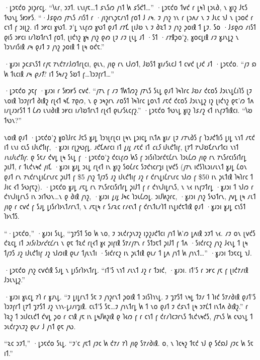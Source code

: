 ·𐑛𐑮𐑱𐑒𐑴 𐑜𐑦𐑜𐑩𐑤𐑛. “𐑘𐑧𐑩, 𐑮𐑲𐑑. 𐑧𐑯𐑦𐑢𐑱…𐑑 𐑭𐑯𐑕𐑼 𐑢𐑪𐑑 𐑿 𐑭𐑕𐑒𐑑…” ·𐑛𐑮𐑱𐑒𐑴 𐑑𐑫𐑒 𐑩 𐑛𐑰𐑐 𐑚𐑮𐑧𐑔, 𐑯 𐑣𐑦𐑟 𐑓𐑱𐑕 𐑑𐑻𐑯𐑛 𐑕𐑽𐑾𐑕. “·𐑓𐑭𐑞𐑼 𐑢𐑳𐑯𐑕 𐑥𐑦𐑕𐑑 𐑩 ·𐑢𐑦𐑟𐑩𐑯𐑜𐑱𐑥𐑪𐑑 𐑝𐑴𐑑 𐑓 𐑥𐑰. 𐑲 𐑢𐑪𐑟 𐑪𐑯 𐑩 𐑚𐑮𐑵𐑥 𐑯 𐑲 𐑓𐑧𐑤 𐑪𐑓 𐑯 𐑚𐑮𐑴𐑒 𐑩 𐑤𐑪𐑑 𐑝 𐑮𐑦𐑚𐑟. 𐑦𐑑 𐑮𐑾𐑤𐑦 𐑣𐑻𐑑. 𐑲'𐑛 𐑯𐑧𐑝𐑼 𐑣𐑻𐑑 𐑞𐑨𐑑 𐑥𐑳𐑗 𐑚𐑦𐑓𐑹 𐑯 𐑲 𐑔𐑷𐑑 𐑲 𐑢𐑪𐑟 𐑜𐑴𐑦𐑙 𐑑 𐑛𐑲. 𐑕𐑴 ·𐑓𐑭𐑞𐑼 𐑥𐑦𐑕𐑑 𐑞𐑦𐑕 𐑮𐑾𐑤𐑦 𐑦𐑥𐑐𐑹𐑑𐑩𐑯𐑑 𐑝𐑴𐑑, 𐑚𐑦𐑒𐑪𐑟 𐑣𐑰 𐑢𐑪𐑟 𐑞𐑺 𐑚𐑲 𐑥𐑲 𐑚𐑧𐑛 𐑨𐑑 ·𐑕𐑑 ·𐑥𐑳𐑙𐑜𐑴'𐑟, 𐑣𐑴𐑤𐑛𐑦𐑙 𐑥𐑲 𐑣𐑨𐑯𐑛𐑟 𐑯 𐑐𐑮𐑪𐑥𐑦𐑕𐑦𐑙 𐑥𐑰 𐑞𐑨𐑑 𐑲 𐑢𐑪𐑟 𐑜𐑴𐑦𐑙 𐑑 𐑚𐑰 𐑴𐑒𐑱.”

·𐑣𐑨𐑮𐑦 𐑜𐑤𐑭𐑯𐑕𐑑 𐑩𐑢𐑱 𐑳𐑯𐑒𐑳𐑥𐑓𐑼𐑑𐑩𐑚𐑤𐑦, 𐑞𐑧𐑯, 𐑢𐑦𐑞 𐑩𐑯 𐑧𐑓𐑼𐑑, 𐑓𐑹𐑕𐑑 𐑣𐑦𐑥𐑕𐑧𐑤𐑓 𐑑 𐑤𐑫𐑒 𐑚𐑨𐑒 𐑨𐑑 ·𐑛𐑮𐑱𐑒𐑴. “𐑢𐑲 𐑸 𐑿 𐑑𐑧𐑤𐑦𐑙 𐑥𐑰 \emph{𐑞𐑨𐑑}? 𐑦𐑑 𐑕𐑰𐑥𐑟 𐑕𐑹𐑑 𐑝…𐑐𐑮𐑲𐑝𐑩𐑑…”

·𐑛𐑮𐑱𐑒𐑴 𐑜𐑱𐑝 ·𐑣𐑨𐑮𐑦 𐑩 𐑕𐑽𐑾𐑕 𐑤𐑫𐑒. “𐑢𐑳𐑯 𐑝 𐑥𐑲 𐑑𐑿𐑑𐑼𐑟 𐑢𐑳𐑯𐑕 𐑕𐑧𐑛 𐑞𐑨𐑑 𐑐𐑰𐑐𐑩𐑤 𐑓𐑹𐑥 𐑒𐑤𐑴𐑕 𐑓𐑮𐑧𐑯𐑛𐑖𐑦𐑐𐑕 𐑚𐑲 𐑯𐑴𐑦𐑙 𐑐𐑮𐑲𐑝𐑩𐑑 𐑔𐑦𐑙𐑟 𐑩𐑚𐑬𐑑 𐑰𐑗 𐑳𐑞𐑼, 𐑯 𐑞 𐑮𐑰𐑟𐑩𐑯 𐑥𐑴𐑕𐑑 𐑐𐑰𐑐𐑩𐑤 𐑛𐑴𐑯𐑑 𐑥𐑱𐑒 𐑒𐑤𐑴𐑕 𐑓𐑮𐑧𐑯𐑛𐑟 𐑦𐑟 𐑚𐑦𐑒𐑪𐑟 𐑞𐑱'𐑼 𐑑𐑵 𐑦𐑥𐑚𐑨𐑮𐑩𐑕𐑑 𐑑 𐑖𐑺 𐑧𐑯𐑦𐑔𐑦𐑙 𐑮𐑾𐑤𐑦 𐑦𐑥𐑐𐑹𐑑𐑩𐑯𐑑 𐑩𐑚𐑬𐑑 𐑞𐑧𐑥𐑕𐑧𐑤𐑝𐑟.” ·𐑛𐑮𐑱𐑒𐑴 𐑑𐑻𐑯𐑛 𐑣𐑦𐑟 𐑐𐑭𐑥𐑟 𐑬𐑑 𐑦𐑯𐑝𐑲𐑑𐑦𐑙𐑤𐑦. “𐑘𐑹 𐑑𐑻𐑯?”

𐑯𐑴𐑦𐑙 𐑞𐑨𐑑 ·𐑛𐑮𐑱𐑒𐑴'𐑟 𐑣𐑴𐑐𐑓𐑩𐑤 𐑓𐑱𐑕 𐑣𐑨𐑛 𐑐𐑮𐑪𐑚𐑩𐑚𐑤𐑦 𐑚𐑰𐑯 𐑛𐑮𐑦𐑤𐑛 𐑦𐑯𐑑𐑵 𐑣𐑦𐑥 𐑚𐑲 𐑥𐑳𐑯𐑔𐑕 𐑝 𐑐𐑮𐑨𐑒𐑑𐑦𐑕 𐑛𐑦𐑛 𐑯𐑪𐑑 𐑥𐑱𐑒 𐑦𐑑 𐑧𐑯𐑦 𐑤𐑧𐑕 𐑦𐑓𐑧𐑒𐑑𐑦𐑝, ·𐑣𐑨𐑮𐑦 𐑩𐑚𐑟𐑻𐑝𐑛. 𐑨𐑒𐑗𐑵𐑩𐑤𐑦 𐑦𐑑 \emph{𐑛𐑦𐑛} 𐑥𐑱𐑒 𐑦𐑑 \emph{𐑤𐑧𐑕} 𐑦𐑓𐑧𐑒𐑑𐑦𐑝, 𐑚𐑳𐑑 𐑳𐑯𐑓𐑹𐑗𐑩𐑯𐑩𐑑𐑤𐑦 𐑯𐑪𐑑 \emph{𐑦𐑯𐑦𐑓𐑧𐑒𐑑𐑦𐑝}. 𐑞 𐑕𐑱𐑥 𐑒𐑫𐑛 𐑚𐑰 𐑕𐑧𐑛 𐑝 ·𐑛𐑮𐑱𐑒𐑴'𐑟 𐑒𐑤𐑧𐑝𐑼 𐑿𐑕 𐑝 𐑮𐑦𐑕𐑦𐑐𐑮𐑩𐑒𐑱𐑖𐑩𐑯 𐑐𐑮𐑧𐑖𐑼 𐑢𐑦𐑞 𐑩𐑯 𐑳𐑯𐑕𐑩𐑤𐑦𐑕𐑦𐑑𐑩𐑛 𐑜𐑦𐑓𐑑, 𐑩 𐑑𐑧𐑒𐑯𐑰𐑒 𐑢𐑦𐑗 ·𐑣𐑨𐑮𐑦 𐑣𐑨𐑛 𐑮𐑧𐑛 𐑩𐑚𐑬𐑑 𐑦𐑯 𐑣𐑦𐑟 𐑕𐑴𐑖𐑩𐑤 𐑕𐑲𐑒𐑪𐑤𐑩𐑡𐑦 𐑚𐑫𐑒𐑕 (𐑢𐑳𐑯 𐑦𐑒𐑕𐑐𐑧𐑮𐑦𐑥𐑧𐑯𐑑 𐑣𐑨𐑛 𐑖𐑴𐑯 𐑞𐑨𐑑 𐑩𐑯 𐑳𐑯𐑒𐑩𐑯𐑛𐑦𐑖𐑩𐑯𐑩𐑤 𐑜𐑦𐑓𐑑 𐑝 \$5 𐑢𐑪𐑟 𐑑𐑢𐑲𐑕 𐑨𐑟 𐑦𐑓𐑧𐑒𐑑𐑦𐑝 𐑨𐑟 𐑩 𐑒𐑩𐑯𐑛𐑦𐑖𐑩𐑯𐑩𐑤 𐑪𐑓𐑼 𐑝 \$50 𐑦𐑯 𐑜𐑧𐑑𐑦𐑙 𐑐𐑰𐑐𐑩𐑤 𐑑 𐑓𐑦𐑤 𐑬𐑑 𐑕𐑻𐑝𐑱𐑟). ·𐑛𐑮𐑱𐑒𐑴 𐑣𐑨𐑛 𐑥𐑱𐑛 𐑩𐑯 𐑳𐑯𐑕𐑩𐑤𐑦𐑕𐑦𐑑𐑩𐑛 𐑜𐑦𐑓𐑑 𐑝 𐑩 𐑒𐑪𐑯𐑓𐑦𐑛𐑩𐑯𐑕, 𐑯 𐑯𐑬 𐑦𐑯𐑝𐑲𐑑𐑩𐑛 ·𐑣𐑨𐑮𐑦 𐑑 𐑪𐑓𐑼 𐑩 𐑒𐑪𐑯𐑓𐑦𐑛𐑩𐑯𐑕 𐑦𐑯 𐑮𐑦𐑑𐑻𐑯…𐑯 𐑞 𐑔𐑦𐑙 𐑢𐑪𐑟, ·𐑣𐑨𐑮𐑦 \emph{𐑛𐑦𐑛} 𐑓𐑰𐑤 𐑐𐑮𐑧𐑖𐑼𐑛. 𐑮𐑦𐑓𐑿𐑟𐑩𐑤, ·𐑣𐑨𐑮𐑦 𐑢𐑪𐑟 𐑕𐑻𐑑𐑩𐑯, 𐑢𐑫𐑛 𐑚𐑰 𐑥𐑧𐑑 𐑢𐑦𐑞 𐑩 𐑤𐑫𐑒 𐑝 𐑕𐑨𐑛 𐑛𐑦𐑕𐑩𐑐𐑶𐑯𐑑𐑥𐑩𐑯𐑑, 𐑯 𐑥𐑱𐑚𐑰 𐑩 𐑕𐑥𐑷𐑤 𐑩𐑥𐑬𐑯𐑑 𐑝 𐑒𐑩𐑯𐑑𐑧𐑥𐑐𐑑 𐑦𐑯𐑛𐑦𐑒𐑱𐑑𐑦𐑙 𐑞𐑨𐑑 ·𐑣𐑨𐑮𐑦 𐑣𐑨𐑛 𐑤𐑪𐑕𐑑 𐑐𐑶𐑯𐑑𐑕.

“·𐑛𐑮𐑱𐑒𐑴,” ·𐑣𐑨𐑮𐑦 𐑕𐑧𐑛, “𐑡𐑳𐑕𐑑 𐑕𐑴 𐑿 𐑯𐑴, 𐑲 𐑮𐑧𐑒𐑩𐑜𐑯𐑲𐑟 𐑦𐑜𐑟𐑨𐑒𐑑𐑤𐑦 𐑢𐑪𐑑 𐑿'𐑼 𐑛𐑵𐑦𐑙 𐑮𐑲𐑑 𐑯𐑬. 𐑥𐑲 𐑴𐑯 𐑚𐑫𐑒𐑕 𐑒𐑷𐑤𐑛 𐑦𐑑 \emph{𐑮𐑦𐑕𐑦𐑐𐑮𐑩𐑒𐑱𐑖𐑩𐑯} 𐑯 𐑞𐑱 𐑑𐑷𐑒 𐑩𐑚𐑬𐑑 𐑣𐑬 𐑜𐑦𐑝𐑦𐑙 𐑕𐑳𐑥𐑢𐑳𐑯 𐑩 𐑕𐑑𐑮𐑱𐑑 𐑜𐑦𐑓𐑑 𐑝 𐑑𐑵 ·𐑕𐑦𐑒𐑩𐑤𐑟 𐑢𐑪𐑟 𐑓𐑬𐑯𐑛 𐑑 𐑚𐑰 𐑑𐑢𐑲𐑕 𐑨𐑟 𐑦𐑓𐑧𐑒𐑑𐑦𐑝 𐑨𐑟 𐑪𐑓𐑼𐑦𐑙 𐑞𐑧𐑥 𐑑𐑢𐑧𐑯𐑑𐑦 ·𐑕𐑦𐑒𐑩𐑤𐑟 𐑦𐑯 𐑜𐑧𐑑𐑦𐑙 𐑞𐑧𐑥 𐑑 𐑛𐑵 𐑢𐑪𐑑 𐑿 𐑢𐑪𐑯𐑑…” ·𐑣𐑨𐑮𐑦 𐑑𐑮𐑱𐑤𐑛 𐑪𐑓.

·𐑛𐑮𐑱𐑒𐑴 𐑢𐑪𐑟 𐑤𐑫𐑒𐑦𐑙 𐑕𐑨𐑛 𐑯 𐑛𐑦𐑕𐑩𐑐𐑶𐑯𐑑𐑩𐑛. “𐑦𐑑'𐑕 𐑯𐑪𐑑 𐑥𐑧𐑯𐑑 𐑨𐑟 𐑩 𐑑𐑮𐑦𐑒, ·𐑣𐑨𐑮𐑦. 𐑦𐑑'𐑕 𐑩 𐑮𐑾𐑤 𐑢𐑱 𐑝 𐑚𐑦𐑒𐑳𐑥𐑦𐑙 𐑓𐑮𐑧𐑯𐑛𐑟.”

·𐑣𐑨𐑮𐑦 𐑣𐑧𐑤𐑛 𐑳𐑐 𐑩 𐑣𐑨𐑯𐑛. “𐑲 𐑛𐑦𐑛𐑩𐑯𐑑 𐑕𐑱 𐑲 𐑢𐑪𐑟𐑩𐑯𐑑 𐑜𐑴𐑦𐑙 𐑑 𐑮𐑦𐑕𐑐𐑪𐑯𐑛. 𐑲 𐑡𐑳𐑕𐑑 𐑯𐑰𐑛 𐑑𐑲𐑥 𐑑 𐑐𐑦𐑒 𐑕𐑳𐑥𐑔𐑦𐑙 𐑞𐑨𐑑'𐑕 𐑐𐑮𐑲𐑝𐑩𐑑 𐑚𐑳𐑑 𐑡𐑳𐑕𐑑 𐑨𐑟 𐑯𐑪𐑯-𐑛𐑨𐑥𐑦𐑡𐑦𐑙. 𐑤𐑧𐑑'𐑕 𐑕𐑱…𐑲 𐑢𐑪𐑯𐑑𐑩𐑛 𐑿 𐑑 𐑯𐑴 𐑞𐑨𐑑 𐑲 𐑒𐑭𐑯𐑑 𐑚𐑰 𐑮𐑳𐑖𐑑 𐑦𐑯𐑑𐑵 𐑔𐑦𐑙𐑟.” 𐑩 𐑐𐑷𐑟 𐑑 𐑮𐑦𐑓𐑤𐑧𐑒𐑑 𐑒𐑫𐑛 𐑜𐑴 𐑩 𐑤𐑪𐑙 𐑢𐑱 𐑦𐑯 𐑛𐑰𐑓𐑿𐑟𐑦𐑙 𐑞 𐑐𐑬𐑼 𐑝 𐑩 𐑤𐑪𐑑 𐑝 𐑒𐑩𐑥𐑐𐑤𐑲𐑩𐑯𐑕 𐑑𐑧𐑒𐑯𐑰𐑒𐑕, 𐑢𐑳𐑯𐑕 𐑿 𐑤𐑻𐑯𐑛 𐑑 𐑮𐑧𐑒𐑩𐑜𐑯𐑲𐑟 𐑞𐑧𐑥 𐑓 𐑢𐑪𐑑 𐑞𐑱 𐑢𐑻.

“𐑷𐑤 𐑮𐑲𐑑,” ·𐑛𐑮𐑱𐑒𐑴 𐑕𐑧𐑛. “𐑲'𐑤 𐑢𐑱𐑑 𐑢𐑲𐑤 𐑿 𐑒𐑳𐑥 𐑳𐑐 𐑢𐑦𐑞 𐑕𐑳𐑥𐑔𐑦𐑙. 𐑴, 𐑯 𐑐𐑤𐑰𐑟 𐑑𐑱𐑒 𐑪𐑓 𐑞 𐑕𐑒𐑸𐑓 𐑢𐑲𐑤 𐑿 𐑕𐑱 𐑦𐑑.”

